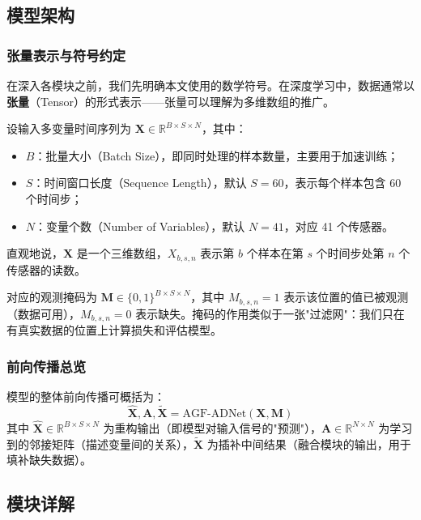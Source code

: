 \documentclass[UTF8]{ctexart}
\begin{document}
\subsection{模型架构}

\subsubsection{张量表示与符号约定}

在深入各模块之前，我们先明确本文使用的数学符号。在深度学习中，数据通常以\textbf{张量}（Tensor）的形式表示——张量可以理解为多维数组的推广。

设输入多变量时间序列为 $\mathbf{X} \in \mathbb{R}^{B \times S \times N}$，其中：
\begin{itemize}
    \item $B$：批量大小（Batch Size），即同时处理的样本数量，主要用于加速训练；
    \item $S$：时间窗口长度（Sequence Length），默认 $S=60$，表示每个样本包含 60 个时间步；
    \item $N$：变量个数（Number of Variables），默认 $N=41$，对应 41 个传感器。
\end{itemize}

直观地说，$\mathbf{X}$ 是一个三维数组，$X_{b,s,n}$ 表示第 $b$ 个样本在第 $s$ 个时间步处第 $n$ 个传感器的读数。

对应的观测掩码为 $\mathbf{M} \in \{0,1\}^{B \times S \times N}$，其中 $M_{b,s,n}=1$ 表示该位置的值已被观测（数据可用），$M_{b,s,n}=0$ 表示缺失。掩码的作用类似于一张"过滤网"：我们只在有真实数据的位置上计算损失和评估模型。

\subsubsection{前向传播总览}

模型的整体前向传播可概括为：
\begin{equation}
    \hat{\mathbf{X}}, \mathbf{A}, \tilde{\mathbf{X}} = \mathrm{AGF\text{-}ADNet}(\mathbf{X}, \mathbf{M})
\end{equation}
其中 $\hat{\mathbf{X}} \in \mathbb{R}^{B \times S \times N}$ 为重构输出（即模型对输入信号的"预测"），$\mathbf{A} \in \mathbb{R}^{N \times N}$ 为学习到的邻接矩阵（描述变量间的关系），$\tilde{\mathbf{X}}$ 为插补中间结果（融合模块的输出，用于填补缺失数据）。

\subsection{模块详解}
\end{document}
